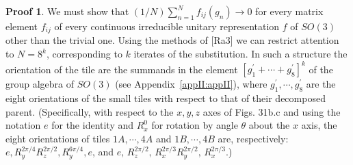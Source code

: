 \documentclass[reqno]{stml-l}
\theoremstyle{plain}
\theoremstyle{definition}
\newtheorem*{proof*}{Proof}
\numberwithin{equation}{chapter}
\begin{document}
\begin{proof*}
We must show that $(1/N)\sum\nolimits_{n=1}^{N}f_{ij}(g_{n})\rightarrow 0$ for every matrix element $f_{ij}$ of every continuous irreducible unitary representation $f$ of $SO(3)$ other than the trivial one. Using the methods of [Ra3] we can restrict attention to $N=8^{k}$, corresponding to $k$ iterates of the substitution. In such a structure the orientation of the tile are the summands in the element $[g_{1}^{\prime}+\cdots+g_{8}^{\prime}]^{k}$ of the group algebra of $SO(3)$ (see Appendix~\ref{appII:appII}), where $g_{1}^{\prime},\cdots,g_{8}^{\prime}$ are the eight orientations of the small tiles with respect to that of their decomposed parent. (Specifically, with respect to the $x,y,z$ axes of Figs. 31b.c and using the notation $e$ for the identity and $R^{0}_{x}$ for rotation by angle $\theta$ about the $x$ axis, the eight orientations of tiles $1A,\cdots,4A$ and $1B,\cdots,4B$ are, respectively: $e,R_{y}^{2\pi/4}R_{z}^{2\pi/2},R_{y}^{6\pi/4},e$, and $e,\,R_{z}^{2\pi/2},\, R_{x}^{2\pi/3}R_{y}^{2\pi/2},\,R_{x}^{2\pi/3}$.)


\end{proof*}
\end{document}

